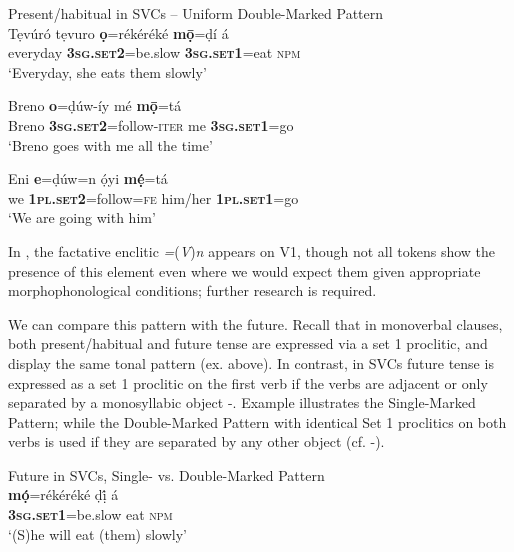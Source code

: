 \documentclass[output=paper]{langsci/langscibook}
\begin{document}
\ea\label{ex:rolle:14}
{Present/habitual in SVCs – Uniform Double-Marked Pattern}\\
\gll   Tẹvúró tẹvuro  \textbf{ọ}=rékéréké       \textbf{mọ̄}=ḍí       á\\ 
       everyday     \textbf{\textsc{3sg.set2}}=be.slow  \textbf{\textsc{3sg.set1}}=eat  \textsc{npm}\\
\glt ‘Everyday, she eats them slowly’ 
\z




\ea\label{ex:rolle:15}
\gll   Breno   \textbf{o}=ḍúw-íy         mé   \textbf{mọ̄}=tá\\ 
       Breno   \textbf{\textsc{3sg.set2}}=follow-\textsc{iter}  me   \textbf{3}\textbf{\textsc{sg.set1}}\textsc{=}go\\
\glt ‘Breno goes with me all the time’
\z




\ea\label{ex:rolle:16}
\gll   Eni   \textbf{e}=ḍúw=n       ọ́yi       \textbf{mẹ́}=tá\\ 
       we   \textbf{\textsc{1pl.set2}}=follow=\textsc{fe}   him/her    \textbf{\textsc{1pl.set1}}=go\\
\glt ‘We are going with him’
\z

In , the factative enclitic \textit{=}(\textit{V})\textit{n} appears on V1, though not all tokens show the presence of this element even where we would expect them given appropriate morphophonological conditions; further research is required. 

We can compare this pattern with the future. Recall that in monoverbal clauses, both present/habitual and future tense are expressed via a set 1 proclitic, and display the same tonal pattern (ex.  above). In contrast, in SVCs future tense is expressed as a set 1 proclitic on the first verb if the verbs are adjacent  or only separated by a monosyllabic object -. Example  illustrates the Single-Marked Pattern; while the Double-Marked Pattern with identical Set 1 proclitics on both verbs is used if they are separated by any other object (cf. -). 


\ea\label{ex:rolle:17}
{Future in SVCs, Single- vs. Double-Marked Pattern}\\
\gll   \textbf{mọ́}=rékéréké     ḍị́   á\\ 
       \textbf{\textsc{3sg.set1}}=be.slow   eat   \textsc{npm}\\
\glt ‘(S)he will eat (them) slowly’ 
\z
\end{document}
